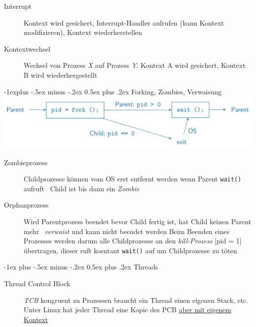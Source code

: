 \documentclass[10pt,landscape,a4paper]{article}
\makeatletter
\renewcommand{\section}{\@startsection{section}{1}{0mm}%
                                {-1ex plus -.5ex minus -.2ex}%
                                {0.5ex plus .2ex}%
                                {\normalfont\large\bfseries}}
\renewcommand{\subsection}{\@startsection{subsection}{2}{0mm}%
                                {-1explus -.5ex minus -.2ex}%
                                {0.5ex plus .2ex}%
                                {\normalfont\small\bfseries}}
\makeatother
\begin{document}
\begin{multicols*}{4}
\smallskip

\begin{description}
  \item[Interrupt] Kontext wird gesichert, Interrupt-Handler aufrufen (kann Kontext modifizieren), Kontext wiederherstellen
  \item[Kontextwechsel] Wechsel von Prozess \textit{X} auf Prozess \textit{Y}. Kontext A wird gesichert, Kontext B wird wiederhergestellt
\end{description}

\subsection{Forking, Zombies, Verwaisung}
\includegraphics[width=1.0\linewidth]{01_forking.JPG}
\begin{description}
  \item[Zombieprozess] Childprozesse können vom OS erst entfernt werden wenn Parent \texttt{wait()} aufruft \textrightarrow~Child ist bis dann ein \textit{Zombie}
  \item[Orphanprozess] Wird Parentprozess beendet bevor Child fertig ist, hat Child keinen Parent mehr \textrightarrow~\textit{verwaist} und kann nicht beendet werden \textrightarrow Beim Beenden eines Prozesses werden darum alle Childprozesse an den \textit{kill-Prozess} [pid = 1] übertragen, dieser ruft kosntant \texttt{wait()} auf um Childprozesse zu töten
\end{description}



\section{Threads}
\begin{description}
  \item[Thread Control Block] \textit{TCB} kongruent zu Prozessen braucht ein Thread einen eigenen Stack, etc. Unter Linux hat jeder Thread eine Kopie des PCB \underline{aber mit eigenem Kontext}
\end{description}


\end{multicols*}
\end{document}
